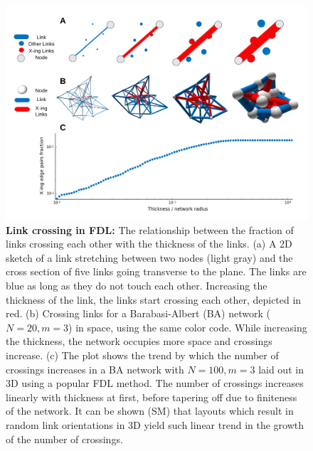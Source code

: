 \documentclass[nofootinbib,preprint,floatfix,endfloats]{revtex4} %
\begin{document}
\begin{figure}
    \centering
    \includegraphics[width=1\columnwidth]{fig-09-19/panel-crs-2.png}
    \caption{{\bf Link crossing in FDL:} The relationship between the fraction of links crossing each other with the thickness of the links. (a) A 2D sketch of a link stretching between two nodes (light gray) and the cross section of five links going transverse to the plane. The links are blue as long as they do not touch each other. Increasing the thickness of the link, the links start crossing each other, depicted in red. (b)  Crossing links for a Barabasi-Albert (BA) network ($N = 20, m = 3$) in space, using the same color code. While increasing the thickness, the network occupies more space and crossings increase. (c) The plot shows the trend by which the number of crossings increases in a BA network with $N=100, m =3$ laid out in 3D using a popular FDL method. The number of crossings increases linearly with thickness at first, before tapering off due to finiteness of the network. It can be shown (SM) that layouts which result in random link orientations in 3D yield such linear trend in the growth of the number of crossings. }
    \label{fig:crossings}
\end{figure}
\end{document}
